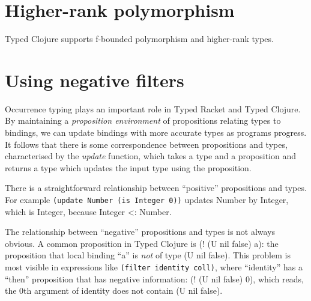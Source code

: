 \documentclass{sigplanconf}
\begin{document}

\section{Higher-rank polymorphism}

Typed Clojure supports f-bounded polymorphism and higher-rank
types.

\section{Using negative filters}

Occurrence typing plays an important role in Typed Racket and Typed Clojure.
By maintaining a \emph{proposition environment} of propositions relating types to
bindings, we can update bindings with more accurate types as programs progress.
It follows that there is some correspondence between propositions and types,
characterised by the \emph{update} function, which takes a type and a proposition
and returns a type which updates the input type using the proposition.

There is a straightforward relationship between ``positive'' propositions and types.
For example 
{\tt (update Number (is Integer 0))}
updates Number by Integer, which is Integer, because Integer <: Number.

The relationship between ``negative'' propositions and types is not always obvious.
A common proposition in Typed Clojure is (! (U nil false) a): the proposition that
local binding ``a'' is \emph{not} of type (U nil false).
This problem is most visible in expressions like {\tt (filter identity coll)}, where
``identity'' has a ``then'' proposition that has negative information: (! (U nil false) 0),
which reads, the 0th argument of identity does not contain (U nil false).
\end{document}
